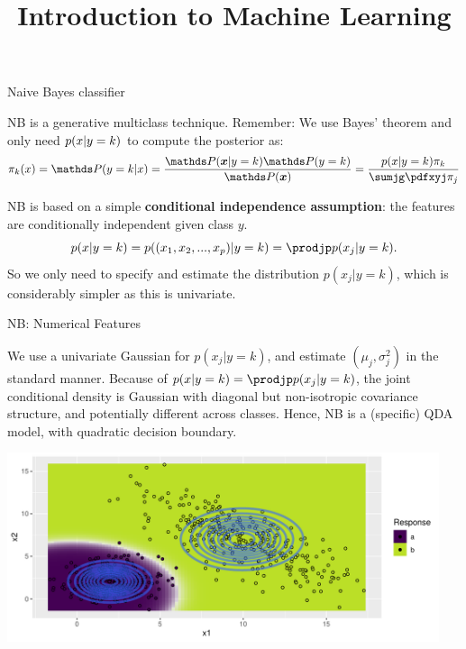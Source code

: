 



\newcommand{\titlefigure}{figure/reg_class_nb_1}
\newcommand{\learninggoals}{
\item Understand the idea of Naive Bayes
\item Understand in which sense Naive Bayes is a special QDA model}

\title{Introduction to Machine Learning}
\date{}


\framebreak

\begin{vbframe}{Naive Bayes classifier}

NB is a generative multiclass technique. Remember: We use Bayes' theorem and only need $p(x | y=k)$ to compute the posterior as:
$$\pikx = \postk = \frac{\P(\xv | y = k) \P(y = k)}{\P(\xv)} = \frac{\pdfxyk \pik}{\sumjg \pdfxyj \pi_j} $$


NB is based on a simple \textbf{conditional independence assumption}: the features are conditionally independent given class $y$.
$$
\pdfxyk = p((x_1, x_2, ..., x_p)|y = k)=\prodjp p(x_j|y = k).
$$
So we only need to specify and estimate the distribution $p(x_j|y = k)$, which is considerably simpler as this is univariate.

\end{vbframe}


\begin{vbframe}{NB: Numerical Features}

We use a univariate Gaussian for $p(x_j | y=k)$, and estimate $(\mu_j, \sigma^2_j)$ in the standard manner. Because of $\pdfxyk = \prodjp p(x_j|y = k)$, the joint conditional density is Gaussian with diagonal but non-isotropic covariance structure, and potentially different across classes. Hence, NB is a (specific) QDA model, with quadratic decision boundary.

\begin{knitrout}\scriptsize
{}\color{fgcolor}

{\centering \includegraphics[width=0.95\textwidth]{figure/reg_class_nb_1} 

}



\end{knitrout}
\end{vbframe}

